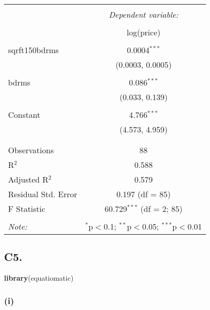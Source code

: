 \documentclass[
]{article}
\newenvironment{Shaded}{\begin{snugshade}}{\end{snugshade}}
\newcommand{\KeywordTok}[1]{\textcolor[rgb]{0.13,0.29,0.53}{\textbf{#1}}}
\newcommand{\NormalTok}[1]{#1}
\begin{document}
\begin{table}[!htbp] \centering 
  \caption{} 
  \label{} 
\begin{tabular}{@{\extracolsep{5pt}}lc} 
\\[-1.8ex]\hline 
\hline \\[-1.8ex] 
 & \multicolumn{1}{c}{\textit{Dependent variable:}} \\ 
\cline{2-2} 
\\[-1.8ex] & log(price) \\ 
\hline \\[-1.8ex] 
 sqrft150bdrms & 0.0004$^{***}$ \\ 
  & (0.0003, 0.0005) \\ 
  & \\ 
 bdrms & 0.086$^{***}$ \\ 
  & (0.033, 0.139) \\ 
  & \\ 
 Constant & 4.766$^{***}$ \\ 
  & (4.573, 4.959) \\ 
  & \\ 
\hline \\[-1.8ex] 
Observations & 88 \\ 
R$^{2}$ & 0.588 \\ 
Adjusted R$^{2}$ & 0.579 \\ 
Residual Std. Error & 0.197 (df = 85) \\ 
F Statistic & 60.729$^{***}$ (df = 2; 85) \\ 
\hline 
\hline \\[-1.8ex] 
\textit{Note:}  & \multicolumn{1}{r}{$^{*}$p$<$0.1; $^{**}$p$<$0.05; $^{***}$p$<$0.01} \\ 
\end{tabular} 
\end{table}

\hypertarget{c5.}{%
\subsection{C5.}\label{c5.}}

\begin{Shaded}
\begin{Highlighting}[]
\KeywordTok{library}\NormalTok{(equatiomatic)}
\end{Highlighting}
\end{Shaded}

\hypertarget{i-3}{%
\subsubsection{(i)}\label{i-3}}
\end{document}
